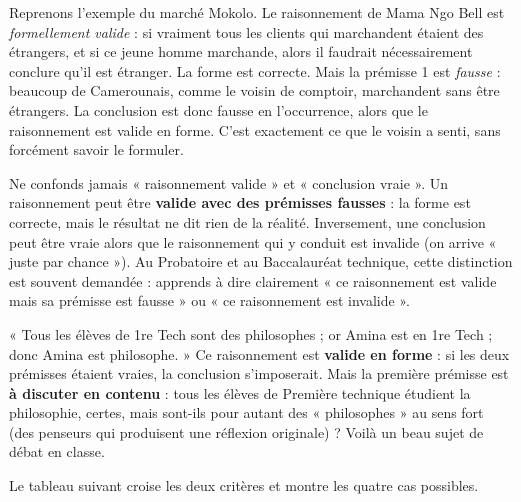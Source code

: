 \documentclass[11pt]{article}
\begin{document}
Reprenons l'exemple du marché Mokolo. Le raisonnement de Mama Ngo Bell est \emph{formellement valide} : si vraiment tous les clients qui marchandent étaient des étrangers, et si ce jeune homme marchande, alors il faudrait nécessairement conclure qu'il est étranger. La forme est correcte. Mais la prémisse 1 est \emph{fausse} : beaucoup de Camerounais, comme le voisin de comptoir, marchandent sans être étrangers. La conclusion est donc fausse en l'occurrence, alors que le raisonnement est valide en forme. C'est exactement ce que le voisin a senti, sans forcément savoir le formuler.

\begin{attention}
Ne confonds jamais « raisonnement valide » et « conclusion vraie ». Un raisonnement peut être \textbf{valide avec des prémisses fausses} : la forme est correcte, mais le résultat ne dit rien de la réalité. Inversement, une conclusion peut être vraie alors que le raisonnement qui y conduit est invalide (on arrive « juste par chance »). Au Probatoire et au Baccalauréat technique, cette distinction est souvent demandée : apprends à dire clairement « ce raisonnement est valide mais sa prémisse est fausse » ou « ce raisonnement est invalide ».
\end{attention}

\begin{exemplebox}
« Tous les élèves de 1re Tech sont des philosophes ; or Amina est en 1re Tech ; donc Amina est philosophe. » Ce raisonnement est \textbf{valide en forme} : si les deux prémisses étaient vraies, la conclusion s'imposerait. Mais la première prémisse est \textbf{à discuter en contenu} : tous les élèves de Première technique étudient la philosophie, certes, mais sont-ils pour autant des « philosophes » au sens fort (des penseurs qui produisent une réflexion originale) ? Voilà un beau sujet de débat en classe.
\end{exemplebox}

Le tableau suivant croise les deux critères et montre les quatre cas possibles.
\end{document}
